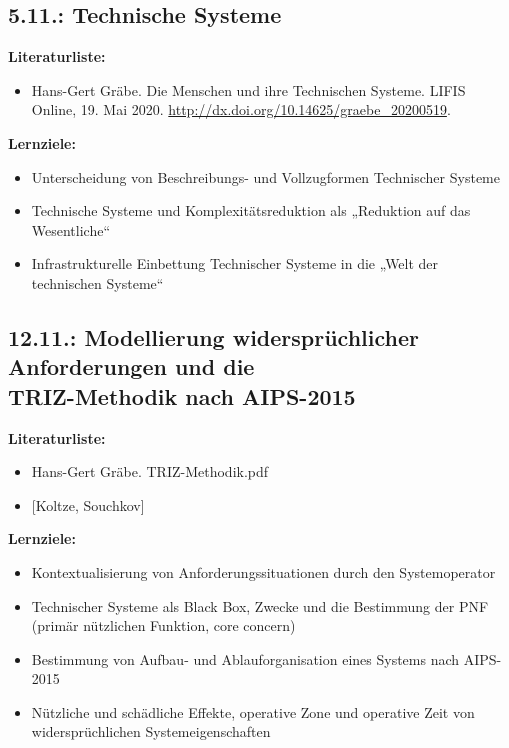 \documentclass[11pt,a4paper]{article}
\begin{document}
\subsection{5.11.: Technische Systeme}

\textbf{Literaturliste:}
\begin{itemize}[noitemsep]
\item Hans-Gert Gräbe. Die Menschen und ihre Technischen Systeme. LIFIS
  Online, 19. Mai 2020. \url{http://dx.doi.org/10.14625/graebe_20200519}.
\end{itemize}

\textbf{Lernziele:}
\begin{itemize}[noitemsep]
\item Unterscheidung von Beschreibungs- und Vollzugformen Technischer Systeme
\item Technische Systeme und Komplexitätsreduktion als „Reduktion auf das
  Wesentliche“
\item Infrastrukturelle Einbettung Technischer Systeme in die „Welt der
  technischen Systeme“
\end{itemize}

\subsection{12.11.: Modellierung widersprüchlicher Anforderungen und die\\
  TRIZ-Methodik nach AIPS-2015}

\textbf{Literaturliste:}
\begin{itemize}[noitemsep]
\item Hans-Gert Gräbe. TRIZ-Methodik.pdf
\item {}[Koltze, Souchkov]
\end{itemize}

\textbf{Lernziele:}
\begin{itemize}[noitemsep]
\item Kontextualisierung von Anforderungssituationen durch den Systemoperator 
\item Technischer Systeme als Black Box, Zwecke und die Bestimmung der PNF (primär nützlichen
  Funktion, core concern) 
\item Bestimmung von Aufbau- und Ablauforganisation eines Systems nach
  AIPS-2015 
\item Nützliche und schädliche Effekte, operative Zone und operative Zeit von
  widersprüch\-lichen Systemeigenschaften
\end{itemize}
\end{document}
